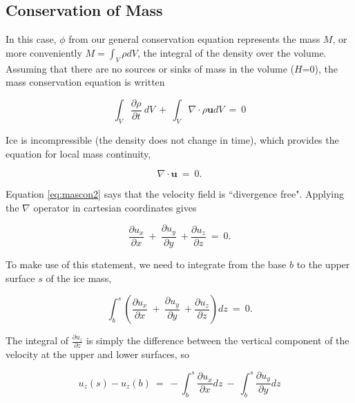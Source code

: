 \subsection{Conservation of Mass}

In this case, $\phi$ from our general conservation equation represents the mass $M$, or more conveniently
$M = \int_V \rho dV$, the integral of the density over the volume. Assuming that there are no sources or 
sinks of mass in the volume ($H$=0), the mass conservation equation is written

\begin{equation}
\int_{V}\frac{\partial \rho} {\partial t} ~dV ~+~ \int_{V} \nabla \cdot \rho \mathbf{u} dV~=~0
\label{eq:mascon1}
\end{equation}

Ice is incompressible (the density does not change in time), which provides the equation for 
local mass continuity,

\begin{equation}
\nabla \cdot \mathbf{u} ~=~0.
\label{eq:mascon2}
\end{equation}

Equation \eqref{eq:mascon2} says that the velocity field is ``divergence free". Applying the $\nabla$ 
operator in cartesian coordinates gives

\begin{equation}
\frac{\partial u_{x}}{\partial x}~+~\frac{\partial u_{y}}{\partial y} ~+\frac{\partial u_{z}}{\partial z}~=~0.  
\label{eq:mascon3}
\end{equation}

To make use of this statement, we need to integrate from the base $b$ to the upper surface $s$ of the ice mass,

\begin{equation}
\int_{b}^{s} \left( \frac{\partial u_{x}}{\partial x}~+~\frac{\partial u_{y}}{\partial y} ~+\frac{\partial u_{z}}{\partial z}\right) dz~=~0.  
\label{eq:mascon4}
\end{equation}

The integral of $\frac{\partial u_z}{\partial z}$ is simply the difference between
the vertical component of the velocity at the upper and lower surfaces, so

\begin{equation}
u_{z} \left(s\right)-u_{z} \left(b\right)~=~-\int_{b}^{s} \frac{\partial u_{x}}{\partial x} dz ~-~\int_{b}^{s} \frac{\partial u_{y}}{\partial y} dz  
\label{eq:mascon5}
\end{equation}

